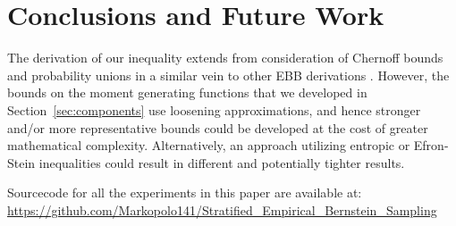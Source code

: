 \section{Conclusions and Future Work}\label{sec:future}







The derivation of our inequality extends from consideration of Chernoff bounds and probability unions in a similar vein to other EBB derivations \citep{Maurer50empiricalbernstein,bardenet2015}.
However, the bounds on the moment generating functions that we developed in Section~\ref{sec:components} use loosening approximations, and hence stronger and/or more representative bounds could be developed at the cost of greater mathematical complexity.
Alternatively, an approach utilizing entropic \citep{Boucheron_concentrationinequalities} or Efron-Stein inequalities \citep{efron1981} could result in different and potentially tighter results.




Sourcecode for all the experiments in this paper are available at:\\ \href{https://github.com/Markopolo141/Stratified\_Empirical\_Bernstein\_Sampling}{https://github.com/Markopolo141/Stratified\_Empirical\_Bernstein\_Sampling
}


